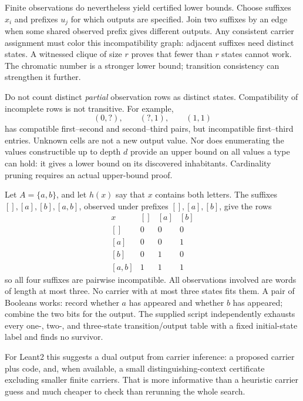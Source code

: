 Finite observations do nevertheless yield certified lower bounds. Choose suffixes $x_i$ and prefixes $u_j$ for which outputs are specified. Join two suffixes by an edge when some shared observed prefix gives different outputs. Any consistent carrier assignment must color this incompatibility graph: adjacent suffixes need distinct states. A witnessed clique of size $r$ proves that fewer than $r$ states cannot work. The chromatic number is a stronger lower bound; transition consistency can strengthen it further.

Do not count distinct \emph{partial} observation rows as distinct states. Compatibility of incomplete rows is not transitive. For example,
\[
 (0,?),\qquad (?,1),\qquad (1,1)
\]
has compatible first--second and second--third pairs, but incompatible first--third entries. Unknown cells are not a new output value. Nor does enumerating the values constructible up to depth $d$ provide an upper bound on all values a type can hold: it gives a lower bound on its discovered inhabitants. Cardinality pruning requires an actual upper-bound proof.

\begin{example}\label{ex:fourstate}
Let $A=\{a,b\}$, and let $h(x)$ say that $x$ contains both letters. The suffixes $[],[a],[b],[a,b]$, observed under prefixes $[],[a],[b]$, give the rows
\[
\begin{array}{c|ccc}
 x & [] & [a] & [b]\\\hline
 {[]}&0&0&0\\
 {[a]}&0&0&1\\
 {[b]}&0&1&0\\
 {[a,b]}&1&1&1
\end{array}
\]
so all four suffixes are pairwise incompatible. All observations involved are words of length at most three. No carrier with at most three states fits them. A pair of Booleans works: record whether $a$ has appeared and whether $b$ has appeared; combine the two bits for the output. The supplied script independently exhausts every one-, two-, and three-state transition/output table with a fixed initial-state label and finds no survivor.
\end{example}

For Leant2 this suggests a dual output from carrier inference: a proposed carrier plus code, and, when available, a small distinguishing-context certificate excluding smaller finite carriers. That is more informative than a heuristic carrier guess and much cheaper to check than rerunning the whole search.

